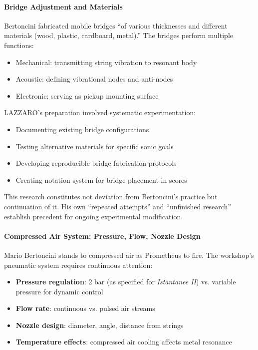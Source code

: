 \paragraph{Bridge Adjustment and Materials}
Bertoncini fabricated mobile bridges ``of various thicknesses and different 
materials (wood, plastic, cardboard, metal).'' The bridges perform multiple 
functions:
\begin{itemize}
  \item Mechanical: transmitting string vibration to resonant body
  \item Acoustic: defining vibrational nodes and anti-nodes
  \item Electronic: serving as pickup mounting surface
\end{itemize}

LAZZARO's preparation involved systematic experimentation:
\begin{itemize}
  \item Documenting existing bridge configurations
  \item Testing alternative materials for specific sonic goals
  \item Developing reproducible bridge fabrication protocols
  \item Creating notation system for bridge placement in scores
\end{itemize}

This research constitutes not deviation from Bertoncini's practice but 
continuation of it. His own ``repeated attempts'' and ``unfinished research'' 
establish precedent for ongoing experimental modification.

\paragraph{Compressed Air System: Pressure, Flow, Nozzle Design}
Mario Bertoncini stands to compressed air as Prometheus to fire. The workshop's 
pneumatic system requires continuous attention:

\begin{itemize}
  \item \textbf{Pressure regulation}: 2 bar (as specified for \emph{Istantanee II}) 
  vs. variable pressure for dynamic control
  \item \textbf{Flow rate}: continuous vs. pulsed air streams
  \item \textbf{Nozzle design}: diameter, angle, distance from strings
  \item \textbf{Temperature effects}: compressed air cooling affects metal 
  resonance
\end{itemize}

